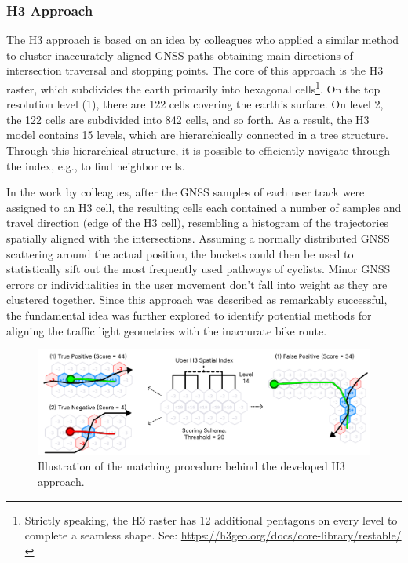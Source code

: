 \subsubsection{H3 Approach}

The H3 approach is based on an idea by colleagues who applied a similar method to cluster inaccurately aligned GNSS paths obtaining main directions of intersection traversal and stopping points. The core of this approach is the H3 raster, which subdivides the earth primarily into hexagonal cells\footnote{Strictly speaking, the H3 raster has 12 additional pentagons on every level to complete a seamless shape. See: \url{https://h3geo.org/docs/core-library/restable/}}. On the top resolution level (1), there are 122 cells covering the earth's surface. On level 2, the 122 cells are subdivided into 842 cells, and so forth. As a result, the H3 model contains 15 levels, which are hierarchically connected in a tree structure. Through this hierarchical structure, it is possible to efficiently navigate through the index, e.g., to find neighbor cells. 

In the work by colleagues, after the GNSS samples of each user track were assigned to an H3 cell, the resulting cells each contained a number of samples and travel direction (edge of the H3 cell), resembling a histogram of the trajectories spatially aligned with the intersections. Assuming a normally distributed GNSS scattering around the actual position, the buckets could then be used to statistically sift out the most frequently used pathways of cyclists. Minor GNSS errors or individualities in the user movement don't fall into weight as they are clustered together. Since this approach was described as remarkably successful, the fundamental idea was further explored to identify potential methods for aligning the traffic light geometries with the inaccurate bike route.

\begin{figure}[t]
\centering
\includegraphics[width=\linewidth]{images/sg-selection-h3-approach.pdf}
\caption{Illustration of the matching procedure behind the developed H3 approach.}
\label{fig:sg-selection-h3-approach}
\end{figure}

